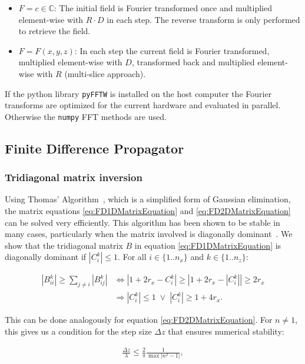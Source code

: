 \begin{itemize}
    \item $F = c \in \mathbb{C}$: The initial field is Fourier transformed once and multiplied element-wise with $R \cdot D$ in each step. The reverse transform is only performed to retrieve the field.
    \item $F = F(x,y,z)$: In each step the current field is Fourier transformed, multiplied element-wise with $D$, transformed back and multiplied element-wise with $R$ (multi-slice approach).
\end{itemize}

If the python library \lstinline{pyFFTW} is installed on the host computer the Fourier transforms are optimized for the current hardware and evaluated in parallel. Otherwise the \lstinline{numpy} FFT methods are used.  

\subsection{Finite Difference Propagator}

\subsubsection{Tridiagonal matrix inversion}

Using Thomas' Algorithm~\cite{Press:1992:NRC:148286}, which is a simplified form of Gaussian elimination, the matrix equations \eqref{eq:FD1DMatrixEquation} and \eqref{eq:FD2DMatrixEquation} can be solved very efficiently. This algorithm has been shown to be stable in many cases, particularly when the matrix involved is diagonally dominant~\cite{Press:1992:NRC:148286}. We show that the tridiagonal matrix $B$ in equation \eqref{eq:FD1DMatrixEquation} is diagonally dominant if $|C_i^k| \le 1$. For all $i \in \{1..n_x\}$ and $k \in \{1..n_z\}$:

\begin{align*}
    |B_{ii}^k| \ge \sum_{j \ne i} |B_{ij}^k| & \Leftrightarrow |1 + 2r_x - C_i^k|\ge \left|1 + 2r_x - |C_i^k| \right| \ge 2 r_x \\
    & \Rightarrow |C_i^k| \le 1 \; \vee \; |C_i^k| \ge 1 + 4 r_x .
\end{align*}

This can be done analogously for equation \eqref{eq:FD2DMatrixEquation}. For $n \ne 1$, this gives us a condition for the step size $\Delta z$ that ensures numerical stability:

\begin{align*}
    \frac{\Delta z}{\lambda} \le \frac{2}{\pi} \frac{1}{\max |n^2 - 1|},
\end{align*}

